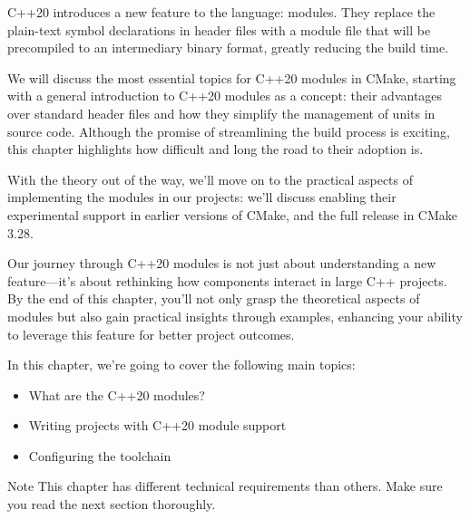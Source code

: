 C++20 introduces a new feature to the language: modules. They replace the plain-text symbol declarations in header files with a module file that will be precompiled to an intermediary binary format, greatly reducing the build time.

We will discuss the most essential topics for C++20 modules in CMake, starting with a general introduction to C++20 modules as a concept: their advantages over standard header files and how they simplify the management of units in source code. Although the promise of streamlining the build process is exciting, this chapter highlights how difficult and long the road to their adoption is.

With the theory out of the way, we’ll move on to the practical aspects of implementing the modules in our projects: we’ll discuss enabling their experimental support in earlier versions of CMake, and the full release in CMake 3.28.

Our journey through C++20 modules is not just about understanding a new feature—it’s about rethinking how components interact in large C++ projects. By the end of this chapter, you’ll not only grasp the theoretical aspects of modules but also gain practical insights through examples, enhancing your ability to leverage this feature for better project outcomes.

In this chapter, we’re going to cover the following main topics:

\begin{itemize}
\item
What are the C++20 modules?

\item
Writing projects with C++20 module support

\item
Configuring the toolchain
\end{itemize}

\begin{myNotic}{Note}
This chapter has different technical requirements than others. Make sure you read the next section thoroughly.
\end{myNotic}














